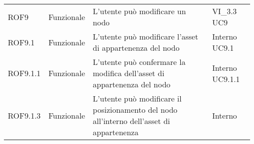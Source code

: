 \begin{longtable}{p{2cm}!{\VRule[1pt]}p{2cm}!{\VRule[1pt]}p{5cm}!{\VRule[1pt]}p{1.5cm}}
	ROF9                             & Funzionale\newline               & L'utente può modificare un nodo                                                                                          & VI_3.3 \newline UC9          
	\\
	ROF9.1                           & Funzionale\newline               & L'utente può modificare l'asset di appartenenza del nodo                                                                 & Interno \newline UC9.1       
	\\
	ROF9.1.1                         & Funzionale\newline               & L'utente può confermare la modifica dell'asset di appartenenza del nodo                                                  & Interno \newline UC9.1.1     
	\\
	ROF9.1.3                         & Funzionale\newline               & L'utente può modificare il posizionamento del nodo all'interno dell'asset di appartenenza                                & Interno                      \\


\end{longtable}

